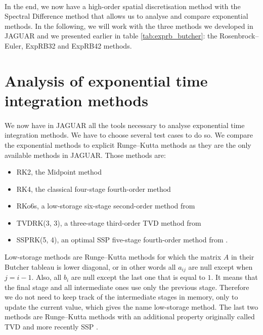     \paragraph{}
    In the end, we now have a high-order spatial discretisation method with the Spectral Difference method that allows us to analyse and compare exponential methods.
    In the following, we will work with the three methods we developed in JAGUAR and we presented earlier in table \ref{tab:exprb_butcher}: the Rosenbrock--Euler, ExpRB32 and ExpRB42 methods.


  \section{Analysis of exponential time integration methods}

    \paragraph{}
    We now have in JAGUAR all the tools necessary to analyse exponential time integration methods.
    We have to choose several test cases to do so.
    We compare the exponential methods to explicit Runge--Kutta methods as they are the only available methods in JAGUAR.
    Those methods are:
    \begin{itemize}
      \item RK2, the Midpoint method
      \item RK4, the classical four-stage fourth-order method
      \item RKo6s, a low-storage six-stage second-order method from \cite{BogeyBailly2004}
      \item TVDRK(3, 3), a three-stage third-order TVD method from \cite{ShuOsher1988, GottliebShu1996}
      \item SSPRK(5, 4), an optimal SSP five-stage fourth-order method from \cite{SpiteriRuuth2002}.
    \end{itemize}
    Low-storage methods are Runge--Kutta methods for which the matrix $A$ in their Butcher tableau is lower diagonal, or in other words all $a_{ij}$ are null except when $j = i - 1$.
    Also, all $b_i$ are null except the last one that is equal to $1$.
    It means that the final stage and all intermediate ones use only the previous stage.
    Therefore we do not need to keep track of the intermediate stages in memory, only to update the current value, which gives the name low-storage method.
    The last two methods are Runge--Kutta methods with an additional property originally called TVD \cite{GottliebShu1996} and more recently SSP  \cite{GottliebShuTadmor2001}.
